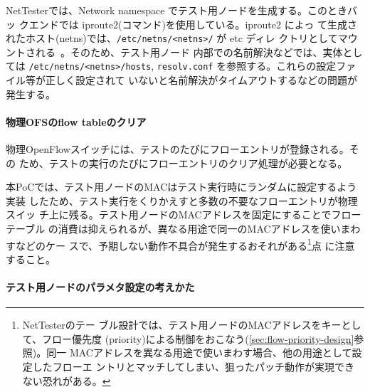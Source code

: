 NetTesterでは、Network namespace でテスト用ノードを生成する。このときバッ
クエンドでは iproute2(コマンド)を使用している。iproute2 によっ
て生成されたホスト(netns)では、\verb|/etc/netns/<netns>/| が etc ディレ
クトリとしてマウントされる~\cite{iproute2-doc}。そのため、テスト用ノード
内部での名前解決などでは、実体としては \verb|/etc/netns/<netns>/hosts|,
\verb|resolv.conf| を参照する。これらの設定ファイル等が正しく設定されて
いないと名前解決がタイムアウトするなどの問題が発生する。

    \paragraph{物理OFSのflow tableのクリア}
物理OpenFlowスイッチには、テストのたびにフローエントリが登録される。その
ため、テストの実行のたびにフローエントリのクリア処理が必要となる。

本PoCでは、テスト用ノードのMACはテスト実行時にランダムに設定するよう実装
したため、テスト実行をくりかえすと多数の不要なフローエントリが物理スイッ
チ上に残る。テスト用ノードのMACアドレスを固定にすることでフローテーブル
の消費は抑えられるが、異なる用途で同一のMACアドレスを使いまわすなどのケー
スで、予期しない動作不具合が発生するおそれがある\footnote{NetTesterのテー
ブル設計では、テスト用ノードのMACアドレスをキーとして、フロー優先度
(priority)による制御をおこなう(\ref{sec:flow-priority-design}参照)。同一
MACアドレスを異なる用途で使いまわす場合、他の用途として設定したフローエ
ントリとマッチしてしまい、狙ったパッチ動作が実現できない恐れがある。}点
に注意すること。

    \paragraph{テスト用ノードのパラメタ設定の考えかた}

